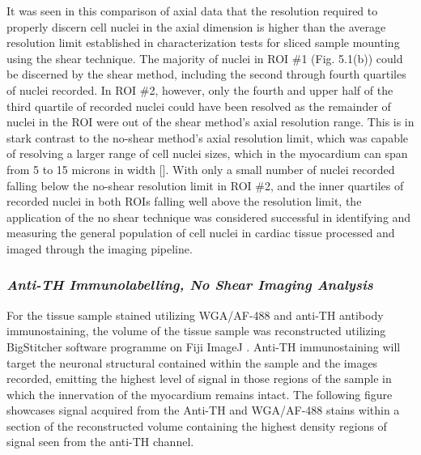 It was seen in this comparison of axial data that the resolution required to properly discern cell nuclei in the axial dimension is higher than the average resolution limit established in characterization tests for sliced sample mounting using the shear technique. The majority of nuclei in ROI \#1 (Fig. 5.1(b)) could be discerned by the shear method, including the second through fourth quartiles of nuclei recorded. In ROI \#2, however, only the fourth and upper half of the third quartile of recorded nuclei could have been resolved as the remainder of nuclei in the ROI were out of the shear method's axial resolution range. This is in stark contrast to the no-shear method's axial resolution limit, which was capable of resolving a larger range of cell nuclei sizes, which in the myocardium can span from 5 to 15 microns in width []. With only a small number of nuclei recorded falling below the no-shear resolution limit in ROI \#2, and the inner quartiles of recorded nuclei in both ROIs falling well above the resolution limit, the application of the no shear technique was considered successful in identifying and measuring the general population of cell nuclei in cardiac tissue processed and imaged through the imaging pipeline.

\subsubsection{\textit{Anti-TH Immunolabelling, No Shear Imaging Analysis}}

For the tissue sample stained utilizing WGA/AF-488 and anti-TH antibody immunostaining, the volume of the tissue sample was reconstructed utilizing BigStitcher software programme on Fiji ImageJ \cite{horl_bigstitcher_2019}. Anti-TH immunostaining will target the neuronal structural contained within the sample and the images recorded, emitting the highest level of signal in those regions of the sample in which the innervation of the myocardium remains intact. The following figure showcases signal acquired from the Anti-TH and WGA/AF-488 stains within a section of the reconstructed volume containing the highest density regions of signal seen from the anti-TH channel.  

